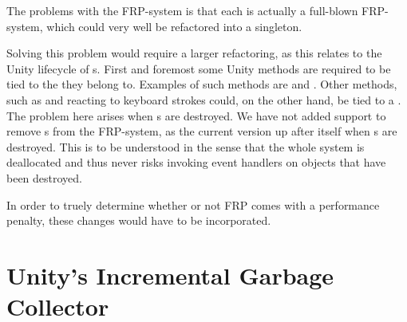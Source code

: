 
The problems with the \gls{FRP}-system is that each  is actually a full-blown \gls{FRP}-system, which could very well be refactored into a singleton.

Solving this problem would require a larger refactoring, as this relates to the Unity lifecycle of s. First and foremost some Unity methods are required to be tied to the  they belong to. Examples of such methods are  and . Other methods, such as  and reacting to keyboard strokes could, on the other hand, be tied to a . The problem here arises when s are destroyed. We have not added support to remove s from the \gls{FRP}-system, as the current version  up after itself when s are destroyed. This is to be understood in the sense that the whole system is deallocated and thus never risks invoking event handlers on objects that have been destroyed.

In order to truely determine whether or not \gls{FRP} comes with a performance penalty, these changes would have to be incorporated.

\section{Unity's Incremental Garbage Collector}
